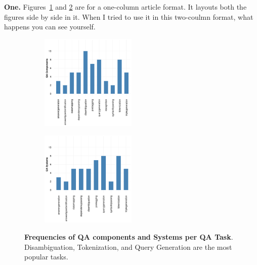 \documentclass{sig-alternate-05-2015}
\begin{document}
\textbf{One.} Figures~\ref{fig:plot1} and \ref{fig:plot2} are for a one-column article format. It layouts both the figures side by side in it. When I tried to use it in this two-coulmn format, what happens you can see yourself.
\begin{figure}
    \centering
    \begin{subfigure}{0.4\textwidth}
        \includegraphics[width=0.5\textwidth]{figures/plot1}
        \label{fig:plot1}
    \end{subfigure}
    \begin{subfigure}{0.4\textwidth}
        \includegraphics[width=0.5\textwidth]{figures/plot2}
        \label{fig:plot2}
    \end{subfigure}
    \caption{{\bf Frequencies of QA components and Systems per QA Task}. Disambiguation, Tokenization, and Query Generation are the most popular tasks.}
    \label{fig:qaestro-components}
\end{figure}
\end{document}
